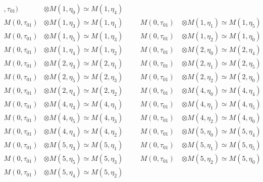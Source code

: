 \begin{align*}
,\tau_{01}) &\otimes M(1,\eta_{0}) \simeq M(1,\eta_{4})\\
M(0,\tau_{01}) &\otimes M(1,\eta_{3}) \simeq M(1,\eta_{1}) &&& M(0,\tau_{01}) \
&\otimes M(1,\eta_{1}) \simeq M(1,\eta_{5})\\
M(0,\tau_{01}) &\otimes M(1,\eta_{5}) \simeq M(1,\eta_{3}) &&& M(0,\tau_{01}) \
&\otimes M(1,\eta_{2}) \simeq M(1,\eta_{0})\\
M(0,\tau_{01}) &\otimes M(1,\eta_{4}) \simeq M(1,\eta_{2}) &&& M(0,\tau_{01}) \
&\otimes M(2,\eta_{0}) \simeq M(2,\eta_{4})\\
M(0,\tau_{01}) &\otimes M(2,\eta_{3}) \simeq M(2,\eta_{1}) &&& M(0,\tau_{01}) \
&\otimes M(2,\eta_{1}) \simeq M(2,\eta_{5})\\
M(0,\tau_{01}) &\otimes M(2,\eta_{5}) \simeq M(2,\eta_{3}) &&& M(0,\tau_{01}) \
&\otimes M(2,\eta_{2}) \simeq M(2,\eta_{0})\\
M(0,\tau_{01}) &\otimes M(2,\eta_{4}) \simeq M(2,\eta_{2}) &&& M(0,\tau_{01}) \
&\otimes M(4,\eta_{0}) \simeq M(4,\eta_{4})\\
M(0,\tau_{01}) &\otimes M(4,\eta_{3}) \simeq M(4,\eta_{1}) &&& M(0,\tau_{01}) \
&\otimes M(4,\eta_{1}) \simeq M(4,\eta_{5})\\
M(0,\tau_{01}) &\otimes M(4,\eta_{5}) \simeq M(4,\eta_{3}) &&& M(0,\tau_{01}) \
&\otimes M(4,\eta_{2}) \simeq M(4,\eta_{0})\\
M(0,\tau_{01}) &\otimes M(4,\eta_{4}) \simeq M(4,\eta_{2}) &&& M(0,\tau_{01}) \
&\otimes M(5,\eta_{0}) \simeq M(5,\eta_{4})\\
M(0,\tau_{01}) &\otimes M(5,\eta_{3}) \simeq M(5,\eta_{1}) &&& M(0,\tau_{01}) \
&\otimes M(5,\eta_{1}) \simeq M(5,\eta_{5})\\
M(0,\tau_{01}) &\otimes M(5,\eta_{5}) \simeq M(5,\eta_{3}) &&& M(0,\tau_{01}) \
&\otimes M(5,\eta_{2}) \simeq M(5,\eta_{0})\\
M(0,\tau_{01}) &\otimes M(5,\eta_{4}) \simeq M(5,\eta_{2})\\
\end{align*}

